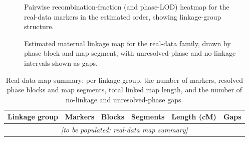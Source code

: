 \documentclass[11pt]{article}
\begin{document}
\begin{figure}[t]
\centering
{}
\caption{Pairwise recombination-fraction (and phase-LOD) heatmap for the real-data
markers in the estimated order, showing linkage-group structure.}
\label{fig:rfheat}
\end{figure}

\begin{figure}[t]
\centering
{}
\caption{Estimated maternal linkage map for the real-data family, drawn by phase block
and map segment, with unresolved-phase and no-linkage intervals shown as gaps.}
\label{fig:realmap}
\end{figure}

\begin{table}[t]
\centering
\caption{Real-data map summary: per linkage group, the number of markers, resolved
phase blocks and map segments, total linked map length, and the number of no-linkage
and unresolved-phase gaps.}
\label{tab:mapsummary}
\begin{tabular}{lccccc}
\toprule
Linkage group & Markers & Blocks & Segments & Length (cM) & Gaps \\
\midrule
\multicolumn{6}{c}{\emph{[to be populated: real-data map summary]}} \\
\bottomrule
\end{tabular}
\end{table}
\end{document}
